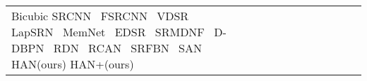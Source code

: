 \documentclass[runningheads]{llncs}
\begin{document}
\begin{table}[!ht]
\begin{tabular}{|p{7em}|p{2.5em}|p{2.5em}|p{3em}|p{2.5em}|p{3em}|p{2.5em}|p{3em}|p{2.5em}|p{3em}|p{2.5em}|p{3em}|}
		Bicubic \newline{}SRCNN~\cite{dong2014learning} \newline{} FSRCNN~\cite{dong2016accelerating} \newline{} VDSR~\cite{kim2016accurate} \newline{} LapSRN~\cite{lai2017deep} \newline{} MemNet~\cite{tai2017memnet} \newline{} EDSR~\cite{lim2017enhanced} \newline{} SRMDNF~\cite{zhang2018learning}  \newline{} D-DBPN~\cite{haris2018deep} \newline{} RDN~\cite{zhang2018residual} \newline{} RCAN~\cite{zhang2018image} \newline{} SRFBN~\cite{li2019feedback} \newline{} SAN~\cite{dai2019second} \newline{} HAN(ours) \newline{} HAN+(ours) &

\end{tabular}
\end{table}
\end{document}

